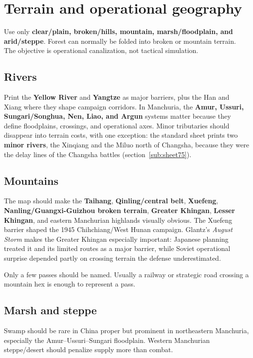 \documentclass[11pt]{article}
\begin{document}
\section{Terrain and operational geography}
Use only \textbf{clear/plain, broken/hills, mountain, marsh/floodplain, and arid/steppe}. Forest can normally be folded into broken or mountain terrain. The objective is operational canalization, not tactical simulation.

\subsection{Rivers}
Print the \textbf{Yellow River} and \textbf{Yangtze} as major barriers, plus the Han and Xiang where they shape campaign corridors. In Manchuria, the \textbf{Amur, Ussuri, Sungari/Songhua, Nen, Liao, and Argun} systems matter because they define floodplains, crossings, and operational axes. Minor tributaries should disappear into terrain costs, with one exception: the standard sheet prints two \textbf{minor rivers}, the Xinqiang and the Miluo north of Changsha, because they were the delay lines of the Changsha battles (section~\ref{sub:sheet75}).

\subsection{Mountains}
The map should make the \textbf{Taihang}, \textbf{Qinling/central belt}, \textbf{Xuefeng}, \textbf{Nanling/Guangxi-Guizhou broken terrain}, \textbf{Greater Khingan}, \textbf{Lesser Khingan}, and eastern Manchurian highlands visually obvious. The Xuefeng barrier shaped the 1945 Chihchiang/West Hunan campaign. Glantz's \emph{August Storm} makes the Greater Khingan especially important: Japanese planning treated it and its limited routes as a major barrier, while Soviet operational surprise depended partly on crossing terrain the defense underestimated.

Only a few passes should be named. Usually a railway or strategic road crossing a mountain hex is enough to represent a pass.

\subsection{Marsh and steppe}
Swamp should be rare in China proper but prominent in northeastern Manchuria, especially the Amur--Ussuri--Sungari floodplain. Western Manchurian steppe/desert should penalize supply more than combat.
\end{document}
